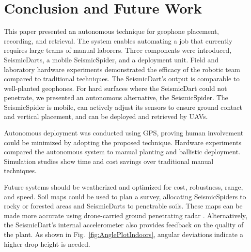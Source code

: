  \section{Conclusion and Future Work}\label{sec:Conclusion}
This paper presented an autonomous technique for geophone placement, recording, and retrieval. The system enables automating a job that currently requires large teams of manual laborers. Three components were introduced, SeismicDarts, a mobile SeismicSpider, and a deployment unit.
Field and laboratory hardware experiments demonstrated the efficacy of the robotic team compared to traditional techniques. 
The SeismicDart's output is comparable to well-planted geophones. 
For hard surfaces where the SeismicDart could not penetrate, we presented an autonomous alternative, the SeismicSpider.  
The SeismicSpider is mobile, can actively adjust its sensors to ensure ground contact and vertical placement, and can be deployed and retrieved by UAVs.

Autonomous deployment was conducted using GPS, proving human involvement could be minimized by adopting the proposed technique. 
Hardware experiments compared the autonomous system to manual planting and ballistic deployment.
Simulation studies show time and cost savings over traditional manual techniques.

Future systems should be weatherized and optimized for cost, robustness, range, and speed. 
Soil maps could be used to plan a survey, allocating SeismicSpiders to rocky or forested areas and SeismicDarts to penetrable soils. 
These maps can be made more accurate using drone-carried ground penetrating radar \cite{merz2015new}. Alternatively, the  SeismicDart's internal accelerometer also provides feedback on the quality of the plant. As shown in Fig.~\ref{fig:AnglePlotIndoors}, angular deviations indicate a higher drop height is needed.  

